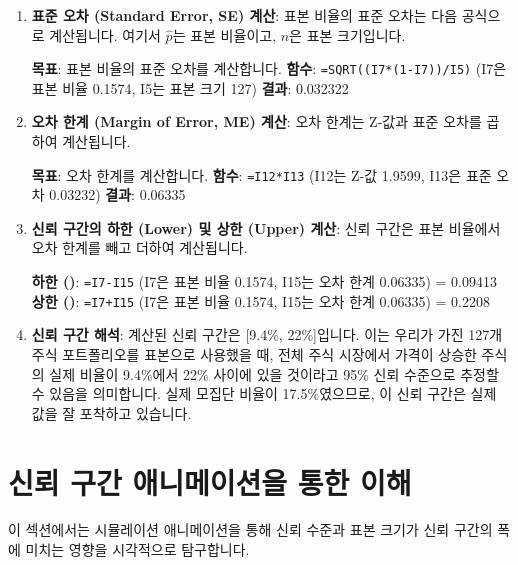 \documentclass[11pt,a4paper]{article}
\theoremstyle{definition}
\newcommand{\code}[1]{\texttt{#1}}
\begin{document}
\begin{enumerate}
    \item \textbf{표준 오차 (Standard Error, SE) 계산}:
    표본 비율의 표준 오차는 다음 공식으로 계산됩니다.
    여기서 $\hat{p}$는 표본 비율이고, $n$은 표본 크기입니다.
    \begin{examplebox}[title=Excel SQRT 함수를 이용한 표준 오차 계산]
        \textbf{목표}: 표본 비율의 표준 오차를 계산합니다.
        \textbf{함수}: \code{=SQRT((I7*(1-I7))/I5)} (I7은 표본 비율 0.1574, I5는 표본 크기 127)
        \textbf{결과}: 0.032322
    \end{examplebox}

    \item \textbf{오차 한계 (Margin of Error, ME) 계산}:
    오차 한계는 Z-값과 표준 오차를 곱하여 계산됩니다.
    \begin{examplebox}[title=Excel 오차 한계 계산]
        \textbf{목표}: 오차 한계를 계산합니다.
        \textbf{함수}: \code{=I12*I13} (I12는 Z-값 1.9599, I13은 표준 오차 0.03232)
        \textbf{결과}: 0.06335
    \end{examplebox}

    \item \textbf{신뢰 구간의 하한 (Lower) 및 상한 (Upper) 계산}:
    신뢰 구간은 표본 비율에서 오차 한계를 빼고 더하여 계산됩니다.
    \begin{examplebox}[title=Excel 신뢰 구간 계산]
        \textbf{하한 ()}: \code{=I7-I15} (I7은 표본 비율 0.1574, I15는 오차 한계 0.06335) = 0.09413
        \textbf{상한 ()}: \code{=I7+I15} (I7은 표본 비율 0.1574, I15는 오차 한계 0.06335) = 0.2208
    \end{examplebox}

    \item \textbf{신뢰 구간 해석}:
    계산된 신뢰 구간은 [9.4\%, 22\%]입니다. 이는 우리가 가진 127개 주식 포트폴리오를 표본으로 사용했을 때, 전체 주식 시장에서 가격이 상승한 주식의 실제 비율이 9.4\%에서 22\% 사이에 있을 것이라고 95\% 신뢰 수준으로 추정할 수 있음을 의미합니다. 실제 모집단 비율이 17.5\%였으므로, 이 신뢰 구간은 실제 값을 잘 포착하고 있습니다.
\end{enumerate}

\newpage
\section{신뢰 구간 애니메이션을 통한 이해}
이 섹션에서는 시뮬레이션 애니메이션을 통해 신뢰 수준과 표본 크기가 신뢰 구간의 폭에 미치는 영향을 시각적으로 탐구합니다.
\end{document}
